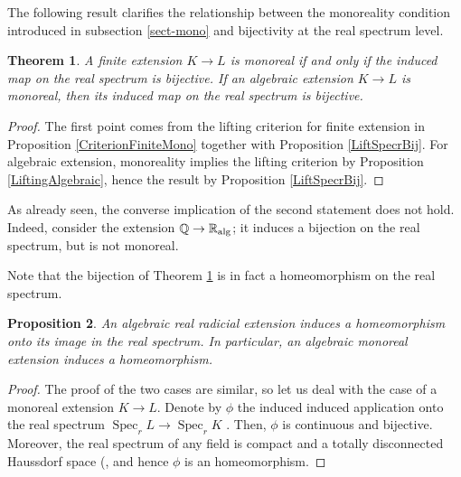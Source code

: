 \documentclass[12pt]{amsart}
\newtheorem{thm}{Theorem}[section]
\newtheorem{prop}[thm]{Proposition}
\theoremstyle{definition}
\DeclareMathOperator{\QQ}{\mathbb Q}
\DeclareMathOperator{\Sp}{Spec}
\def \RR {{\mathbb R}}
\begin{document}
The following result clarifies the relationship between the monoreality condition introduced in subsection \ref{sect-mono} and bijectivity at the real spectrum level. 




\begin{thm}\label{MonoSpecrBij}
	A finite extension $K\to L$ is monoreal if and only if 
	the induced map on the real spectrum is bijective.
	If an algebraic extension $K\to L$ is monoreal, then its induced map on the real spectrum is bijective.
\end{thm}

\begin{proof}
The first point comes from the lifting criterion for finite extension in Proposition \ref{CriterionFiniteMono} together with Proposition \ref{LiftSpecrBij}. For algebraic extension, monoreality implies the lifting criterion by Proposition \ref{LiftingAlgebraic}, hence the result by Proposition \ref{LiftSpecrBij}.
\end{proof}

As already seen, the converse implication of the second statement does not hold. Indeed, consider the extension $\QQ\to \RR_{\rm{alg}}$; it induces a bijection on the real spectrum, but is not monoreal.





Note that the bijection of Theorem \ref{MonoSpecrBij} is in fact a homeomorphism on the real spectrum.

\begin{prop}\label{BijIsHomeo}
An algebraic real radicial extension induces a homeomorphism onto its image in the real spectrum. In particular, an algebraic monoreal extension induces a homeomorphism.
\end{prop}

\begin{proof} The proof of the two cases are similar, so let us deal with the case of a monoreal extension $K\to L$. Denote by $\phi$ the induced induced application onto the real spectrum
$\Sp_r L\to \Sp_r K$ .
Then, $\phi$ is continuous and bijective. Moreover, the real spectrum of any field is compact and a totally disconnected Haussdorf space (\cite[Chap. 3,§2, Lemma 2.8]{HM}, and hence $\phi$ is an homeomorphism.
\end{proof}
\end{document}
